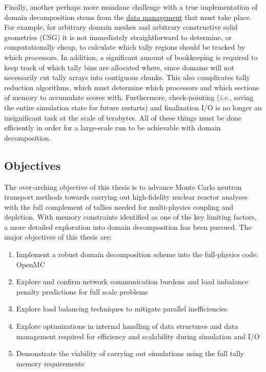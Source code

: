 \documentclass[12pt,twoside]{mitthesis-exec}
\begin{document}
Finally, another perhaps more mundane challenge with a true implementation of
domain decomposition stems from the \underline{data management} that must take
place. For example, for arbitrary domain meshes and arbitrary constructive solid geometries (CSG) it
is not immediately straightforward to determine, or computationally cheap, to
calculate which tally regions should be tracked by which processors. In
addition, a significant amount of bookkeeping is required to keep track of which
tally bins are allocated where, since domains will not necessarily cut tally
arrays into contiguous chunks. This also complicates tally reduction algorithms,
which must determine which processors and which sections of memory to accumulate
scores with. Furthermore, check-pointing (\emph{i.e.}, saving the entire simulation
state for future restarts) and finalization I/O is no longer an
insignificant task at the scale of terabytes. All of these things must be done
efficiently in order for a large-scale run to be achievable with domain
decomposition.

\subsection*{Objectives}

The over-arching objective of this thesis is to advance Monte Carlo neutron
transport methods towards carrying out high-fidelity nuclear reactor
analyses with the full complement of tallies needed for multi-physics coupling
and depletion. With memory constraints identified as one of the key limiting
factors, a more detailed exploration into domain decomposition has been pursued. The 
major objectives of this thesis are:

\begin{enumerate}
  \item Implement a robust domain decomposition scheme into the full-physics code:
  OpenMC
  \item Explore and confirm network communication burdens and load imbalance
  penalty predictions for full scale problems
  \item Explore load balancing techniques to mitigate parallel inefficiencies
  \item Explore optimizations in internal handling of data structures and data
  management required for efficiency and scalability during simulation and I/O
  \item Demonstrate the viability of carrying out simulations using the full
  tally memory requirements
\end{enumerate}
\end{document}
